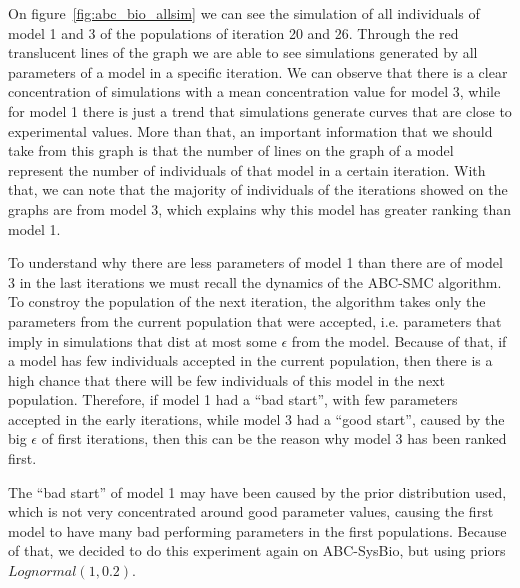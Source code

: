 On figure~\ref{fig:abc_bio_allsim} we can see the simulation of all 
individuals of model 1 and 3 of the populations of iteration 20 and 26.
Through the red translucent lines of the graph we are able to see 
simulations generated by all parameters of a model in a specific 
iteration. We can observe that there is a clear concentration of 
simulations with a mean concentration value for model 3, while for model
1 there is just a trend that simulations generate curves that are close
to experimental values. More than that, an important information that we
should take from this graph is that the number of lines on the graph
of a model represent the number of individuals of that model in a 
certain iteration. With that, we can note that the majority of 
individuals of the iterations showed on the graphs are from model 3, 
which explains why this model has greater ranking than model 1.

To understand why there are less parameters of model 1 than there are
of model 3 in the last iterations we must recall the dynamics of the
ABC-SMC algorithm. To constroy the population of the next iteration, the
algorithm takes only the parameters from the current population that 
were accepted, i.e. parameters that imply in simulations that dist at 
most some $\epsilon$ from the model. Because of that, if a model has few
individuals accepted in the current population, then there is a high 
chance that there will be few individuals of this model in the next 
population. Therefore, if model 1 had a ``bad start'', with few 
parameters accepted in the early iterations, while model 3 had a ``good
start'', caused by the big $\epsilon$ of first iterations, then this can
be the reason why model 3 has been ranked first.

The ``bad start'' of model 1 may have been caused by the prior 
distribution used, which is not very concentrated around good parameter
values, causing the first model to have many bad performing parameters
in the first populations. Because of that, we decided to do this 
experiment again on ABC-SysBio, but using priors $Lognormal (1, 0.2)$.

